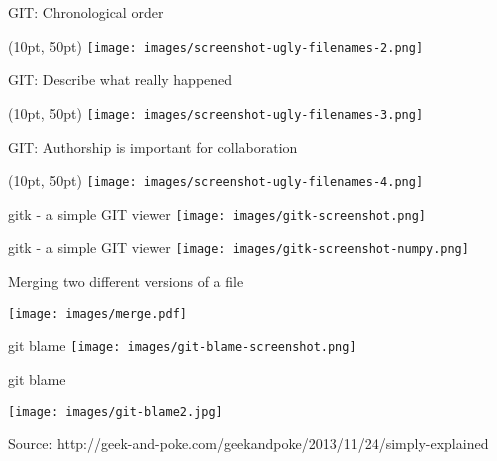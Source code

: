 \begin{frame}[fragile]{GIT: Chronological order}
    \begin{textblock*}{\textwidth}(10pt, 50pt)
        \texttt{[image: images/screenshot-ugly-filenames-2.png]}
    \end{textblock*}
\end{frame}


\begin{frame}[fragile]{GIT: Describe what really happened}
    \begin{textblock*}{\textwidth}(10pt, 50pt)
        \texttt{[image: images/screenshot-ugly-filenames-3.png]}
    \end{textblock*}
\end{frame}


\begin{frame}[fragile]{GIT: Authorship is important for collaboration}
    \begin{textblock*}{\textwidth}(10pt, 50pt)
        \texttt{[image: images/screenshot-ugly-filenames-4.png]}
    \end{textblock*}
\end{frame}


\begin{frame}[fragile]{gitk - a simple GIT viewer}
    \texttt{[image: images/gitk-screenshot.png]}
\end{frame}


\begin{frame}[fragile]{gitk - a simple GIT viewer}
    \texttt{[image: images/gitk-screenshot-numpy.png]}
\end{frame}


\begin{frame}{Merging two different versions of a file}
    \begin{center}
        \texttt{[image: images/merge.pdf]}
    \end{center}
\end{frame}


\begin{frame}[fragile]{git blame}
    \texttt{[image: images/git-blame-screenshot.png]}
\end{frame}


\begin{frame}[fragile]{git blame}
    \begin{center}
        \texttt{[image: images/git-blame2.jpg]}
    \end{center}
    \vfill\pause
    {\tiny Source: http://geek-and-poke.com/geekandpoke/2013/11/24/simply-explained}
\end{frame}


